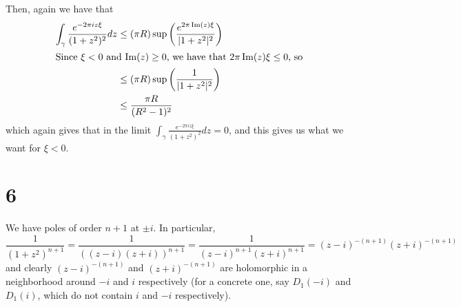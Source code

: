 \documentclass[12pt,letterpaper]{article}
\theoremstyle{definition}
\DeclareMathOperator{\imag}{Im}
\begin{document}
Then, again we have that
\begin{align*}
  \int_{\gamma} \frac{e^{-2\pi i z \xi}}{(1+z^{2})^{2}}dz &\leq (\pi R)\sup \left(\frac{e^{2\pi \imag(z) \xi}}{|1+z^{2}|^{2}}\right) \\
  \intertext{Since $\xi < 0$ and $\imag(z) \geq 0$, we have that $2\pi \imag(z) \xi \leq 0$, so}
                                                          &\leq (\pi R)\sup \left(\frac{1}{|1+z^{2}|^{2}}\right) \\
                                                          &\leq \frac{\pi R}{(R^{2} - 1)^{2}} \\
\end{align*}
which again gives that in the limit $\int_{\gamma} \frac{e^{-2\pi i z \xi}}{(1+z^{2})^{2}}dz = 0$, and this gives us what we want for $\xi < 0$.

\section*{6}

We have poles of order $n+1$ at $\pm i$. In particular,
\[
  \frac{1}{(1+z^{2})^{n+1}} = \frac{1}{((z-i)(z+i))^{n+1}} = \frac{1}{(z-i)^{n+1}(z+i)^{n+1}} = (z-i)^{-(n+1)}(z+i)^{-(n+1)}
\]
and clearly $(z-i)^{-(n+1)}$ and $(z+i)^{-(n+1)}$ are holomorphic in a neighborhood around $-i$ and $i$ respectively (for a concrete one, say $D_{1}(-i)$ and $D_{1}(i)$, which do not contain $i$ and $-i$ respectively).
\end{document}
